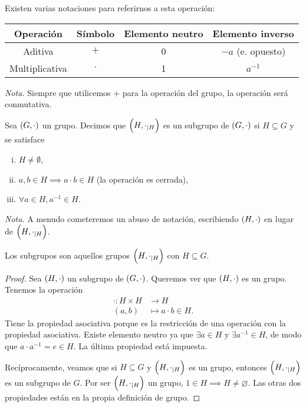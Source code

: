 \begin{obs}
    Existen varias notaciones para referirnos a esta operación:
    \begin{center}
        \begin{tabular}{|c|c|c|c|} \hline
            Operación & S\'imbolo & Elemento neutro & Elemento inverso \\ \hline \hline
            Aditiva & $+$ & 0 & $-a$ (e. opuesto) \\ \hline
            Multiplicativa & $\cdot$ & 1 & $a^{-1}$ \\ \hline
        \end{tabular}
    \end{center}
    \emph{Nota.} Siempre que utilicemos $+$ para la operación del grupo, la operación será conmutativa.
\end{obs}

\begin{defi}[subgrupo] \label{defi:subgrupo}
    Sea $\left( G, \cdot \right)$ un grupo. Decimos que $\left( H, \cdot_{\mid H} \right)$ es un subgrupo de $\left( G, \cdot \right)$ si $H \subseteq G$ y se satisface
    \begin{enumerate}[i)]
        \item $H \neq \emptyset$,
        \item $a, b \in H \implies a\cdot b \in H$ (la operación es cerrada),
        \item $\forall a \in H, a^{-1} \in H$.
    \end{enumerate}
    \emph{Nota. } A menudo cometeremos un abuso de notación, escribiendo $\left( H, \cdot \right)$ en lugar de $\left( H, \cdot_{\mid H} \right)$.
\end{defi}

\begin{prop}
    Los subgrupos son aquellos grupos $\left( H, \cdot_{\mid H} \right)$ con $H\subseteq G$.
\end{prop}
\begin{proof}
    Sea $\left( H, \cdot \right)$ un subgrupo de $\left( G, \cdot \right)$. Queremos ver que $\left( H, \cdot \right)$ es un grupo.
    Tenemos la operación
    \[
        \begin{aligned}
            \cdot \colon H \times H &\to H \\
            (a, b) &\mapsto a\cdot b \in H.
        \end{aligned}
    \]
    Tiene la propiedad asociativa porque es la restricción de una operación con la propiedad asociativa.
    Existe elemento neutro ya que $\exists a \in H$ y $\exists a^{-1} \in H$, de modo que $a\cdot a^{-1}=e \in H$.
    La última propiedad está impuesta.
    
    Recíprocamente, veamos que si $H\subseteq G$ y $\left( H, \cdot_{\mid H} \right)$ es un grupo, entonces $\left( H, \cdot_{\mid H} \right)$ es un subgrupo de $G$. Por ser $\left( H, \cdot_{\mid H} \right)$ un grupo, $1\in H \implies H\neq\varnothing$. Las otras dos propiedades están en la propia definición de grupo.
\end{proof}

